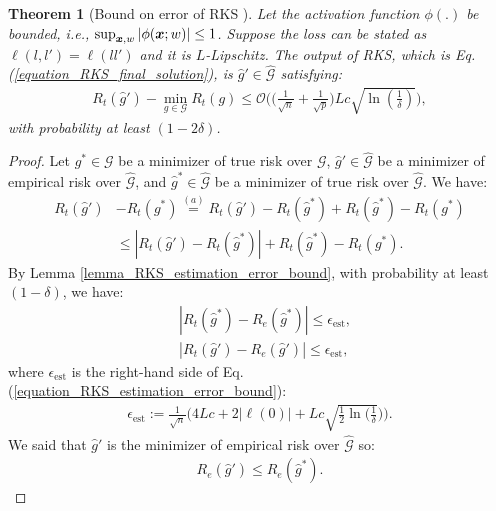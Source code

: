 \documentclass{article}
\newtheorem{theorem}{Theorem}
\def\b{\ensuremath\boldsymbol}
\begin{document}
\begin{theorem}[Bound on error of RKS {\citep[Theorem 1]{rahimi2008weighted}}]\label{theorem_RKS_error}
Let the activation function $\phi(.)$ be bounded, i.e., $\sup_{\b{x}, w}|\phi(\b{x}; w)| \leq 1$. 
Suppose the loss can be stated as $\ell(l,l') = \ell(l l')$ and it is $L$-Lipschitz. 
The output of RKS, which is Eq. (\ref{equation_RKS_final_solution}), is $\widehat{g}' \in \widehat{\mathcal{G}}$ satisfying:
\begin{align}
R_t(\widehat{g}') - \min_{g \in \mathcal{G}} R_t(g) \leq \mathcal{O}\Bigg(\Big(\frac{1}{\sqrt{n}} + \frac{1}{\sqrt{p}}\Big) Lc \sqrt{\ln(\frac{1}{\delta})}\Bigg),
\end{align}
with probability at least $(1 - 2\delta)$.
\end{theorem}
\begin{proof}
Let $g^* \in \mathcal{G}$ be a minimizer of true risk over $\mathcal{G}$, $\widehat{g}' \in \widehat{\mathcal{G}}$ be a minimizer of empirical risk over $\widehat{\mathcal{G}}$, and $\widehat{g}^* \in \widehat{\mathcal{G}}$ be a minimizer of true risk over $\widehat{\mathcal{G}}$.
We have:
\begin{align}
R_t(\widehat{g}')& - R_t(g^*) \overset{(a)}{=} R_t(\widehat{g}') - R_t(\widehat{g}^*) + R_t(\widehat{g}^*) - R_t(g^*) \nonumber\\
&\leq | R_t(\widehat{g}') - R_t(\widehat{g}^*) | + R_t(\widehat{g}^*) - R_t(g^*). \label{equation_RKS_risk_diff_0}
\end{align}
By Lemma \ref{lemma_RKS_estimation_error_bound}, with probability at least $(1-\delta)$, we have:
\begin{align}
& | R_t(\widehat{g}^*) - R_e(\widehat{g}^*) | \leq \epsilon_\text{est}, \label{equation_RKS_risk_diff_1} \\
& | R_t(\widehat{g}') - R_e(\widehat{g}') | \leq \epsilon_\text{est}, \label{equation_RKS_risk_diff_2}
\end{align}
where $\epsilon_\text{est}$ is the right-hand side of Eq. (\ref{equation_RKS_estimation_error_bound}):
\begin{align}\label{equation_RKS_epsilon_est}
\epsilon_\text{est} := \frac{1}{\sqrt{n}} \Bigg(4Lc + 2|\ell(0)| + Lc \sqrt{\frac{1}{2} \ln(\frac{1}{\delta}})\Bigg).
\end{align}
We said that $\widehat{g}'$ is the minimizer of empirical risk over $\widehat{\mathcal{G}}$ so:
\begin{align}\label{equation_RKS_risk_diff_3}
R_e(\widehat{g}') \leq R_e(\widehat{g}^*).
\end{align}

\end{proof}
\end{document}
